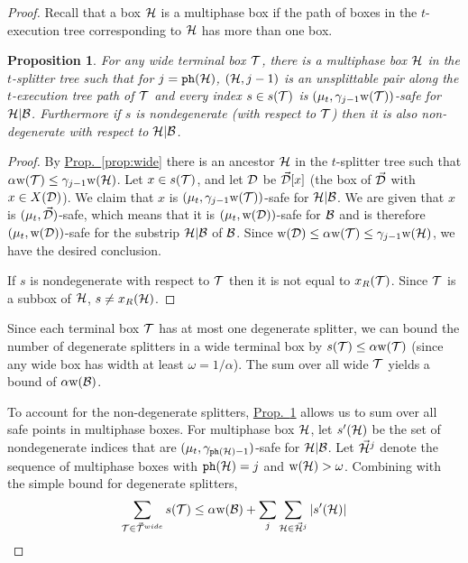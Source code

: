 \documentclass{acmsmall}
\newtheorem{prop}[theorem]{Proposition}
\newcommand{\cB}{{\cal B}}
\newcommand{\cD}{{\cal D}}
\newcommand{\cH}{{\cal H}}
\newcommand{\cT}{{\cal T}}
\newcommand{\Prop}[1]{\hyperref[prop:#1]{Prop.~\ref*{prop:#1}}} %
\newcommand{\phase}{{\tt ph}}
\newcommand{\strip}[2]{#1|#2}
\newcommand{\width}{{\bf {\rm  w}}}
\newcommand{\gridprec}{\alpha}
\begin{document}
\begin{proof}
Recall that a box $\cH$  is a multiphase box if the path of boxes
in the $t$-execution tree corresponding to $\cH$ has more than one box.
%
\begin{prop}
\label{prop:bound-s}
For any wide terminal box $\cT$, there is a multiphase box $\cH$ in the $t$-splitter tree such that for $j=\phase(\cH)$, 
$(\cH,j-1)$ is an unsplittable pair along the $t$-execution tree path of $\cT$
and every index $s \in s(\cT)$ is $(\mu_t,\gamma_{j-1}\width(\cT))$-safe for $\strip{\cH}{\cB}$.
Furthermore if $s$ is nondegenerate (with respect to $\cT$) then it is also non-degenerate with respect to $\strip{\cH}{\cB}$.
\end{prop}
%
\begin{proof}
By \Prop{wide} there is an ancestor $\cH$ in the $t$-splitter tree such that $\gridprec \width(\cT) \leq \gamma_{j-1}\width(\cH)$.
Let $x \in s(\cT)$,  and let $\cD$ be $\vec{\cD}[x]$ (the box of $\vec{\cD}$ with $x \in X(\cD)$). 
We claim that $x$ is
$(\mu_t,\gamma_{j-1}\width(\cT))$-safe  for $\strip{\cH}{\cB}$.  We are given that $x$ is
$(\mu_t,\vec{\cD})$-safe, which means that it is $(\mu_t,\width(\cD))$-safe for $\cB$ and is
therefore $(\mu_t,\width(\cD))$-safe for the substrip $\strip{\cH}{\cB}$ of $\cB$.
Since $\width(\cD) \leq \gridprec \width(\cT) \leq \gamma_{j-1}\width(\cH)$, we have the desired conclusion.

If $s$ is nondegenerate with respect to $\cT$ then it is not equal to $x_R(\cT)$.  Since $\cT$ is a subbox of $\cH$,
$s \neq x_R(\cH)$.
\end{proof}
%
Since each terminal box $\cT$ has at most one degenerate splitter, we can bound the number of degenerate
splitters in a wide terminal box by $s(\cT) \leq \gridprec \width(\cT)$ (since any wide
box has width at least $\omega = 1/\gridprec$). The sum over all wide $\cT$ yields a bound of $\gridprec \width(\cB)$.

To account for the non-degenerate splitters, \Prop{bound-s} allows us to sum over all safe points in multiphase boxes.
For multiphase box $\cH$, let $s'(\cH)$ be the set of nondegenerate indices that are $(\mu_t,\gamma_{\phase(\cH)-1})$-safe for $\strip{\cH}{\cB}$.
Let $\vec{\cH}^j$ denote the sequence of multiphase boxes with $\phase(\cH)=j$ and $\width(\cH) > \omega$. 
Combining with the simple bound for degenerate splitters,
$$ \sum_{\cT \in \vec{\cT}^{wide}} s(\cT) \leq \gridprec \width(\cB) +\sum_{j} \sum_{\cH \in \vec{\cH}^j} |s'(\cH)| $$


\end{proof}
\end{document}
